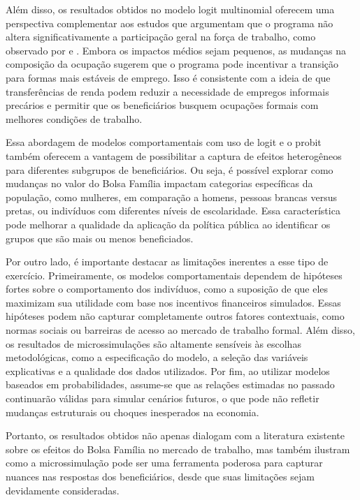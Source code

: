 \documentclass[12pt]{article}
\theoremstyle{break}
\begin{document}
Além disso, os resultados obtidos no modelo logit multinomial oferecem uma perspectiva complementar aos estudos que argumentam que o programa não altera significativamente a participação geral na força de trabalho, como observado por \textcite{debrauw2015bolsa} e \textcite{oliveira2012se}. Embora os impactos médios sejam pequenos, as mudanças na composição da ocupação sugerem que o programa pode incentivar a transição para formas mais estáveis de emprego. Isso é consistente com a ideia de que transferências de renda podem reduzir a necessidade de empregos informais precários e permitir que os beneficiários busquem ocupações formais com melhores condições de trabalho.

Essa abordagem de modelos comportamentais com uso de logit e o probit também oferecem a vantagem de possibilitar a captura de efeitos heterogêneos para diferentes subgrupos de beneficiários. Ou seja, é possível explorar como mudanças no valor do Bolsa Família impactam categorias específicas da população, como mulheres, em comparação a homens, pessoas brancas versus pretas, ou indivíduos com diferentes níveis de escolaridade. Essa característica pode melhorar a qualidade da aplicação da política pública ao identificar os grupos que são mais ou menos beneficiados. 

Por outro lado, é importante destacar as limitações inerentes a esse tipo de exercício. Primeiramente, os modelos comportamentais dependem de hipóteses fortes sobre o comportamento dos indivíduos, como a suposição de que eles maximizam sua utilidade com base nos incentivos financeiros simulados. Essas hipóteses podem não capturar completamente outros fatores contextuais, como normas sociais ou barreiras de acesso ao mercado de trabalho formal. Além disso, os resultados de microssimulações são altamente sensíveis às escolhas metodológicas, como a especificação do modelo, a seleção das variáveis explicativas e a qualidade dos dados utilizados. Por fim, ao utilizar modelos baseados em probabilidades, assume-se que as relações estimadas no passado continuarão válidas para simular cenários futuros, o que pode não refletir mudanças estruturais ou choques inesperados na economia.

Portanto, os resultados obtidos não apenas dialogam com a literatura existente sobre os efeitos do Bolsa Família no mercado de trabalho, mas também ilustram como a microssimulação pode ser uma ferramenta poderosa para capturar nuances nas respostas dos beneficiários, desde que suas limitações sejam devidamente consideradas.
\end{document}
